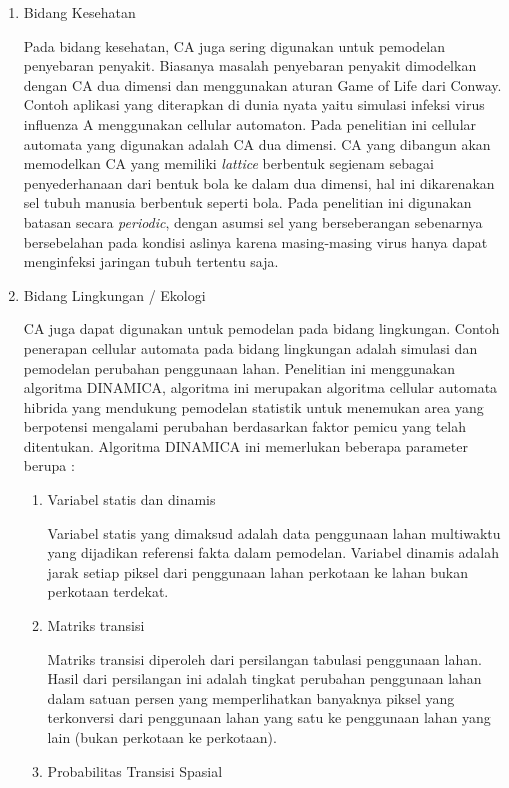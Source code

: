 \begin{enumerate}
\begin{enumerate}
\begin{enumerate}
\begin{enumerate}
			\end{enumerate}
			
			
			\item Bidang Kesehatan
			
			Pada bidang kesehatan, CA juga sering digunakan untuk pemodelan penyebaran penyakit. Biasanya masalah penyebaran penyakit dimodelkan dengan CA dua dimensi dan menggunakan aturan Game of Life dari Conway. Contoh aplikasi yang diterapkan di dunia nyata yaitu simulasi infeksi virus influenza A menggunakan cellular automaton. Pada penelitian ini cellular automata yang digunakan adalah CA dua dimensi. CA yang dibangun akan memodelkan CA yang memiliki \textit{lattice} berbentuk segienam sebagai penyederhanaan dari bentuk bola ke dalam dua dimensi, hal ini dikarenakan sel tubuh manusia berbentuk seperti bola. Pada penelitian ini digunakan batasan secara \textit{periodic}, dengan asumsi sel yang berseberangan sebenarnya bersebelahan pada kondisi aslinya karena masing-masing virus hanya dapat menginfeksi jaringan tubuh tertentu saja. \cite{referensiCA1}
			
			\item Bidang Lingkungan / Ekologi
			
			CA juga dapat digunakan untuk pemodelan pada bidang lingkungan. Contoh penerapan cellular automata pada bidang lingkungan adalah simulasi dan pemodelan perubahan penggunaan lahan. Penelitian ini menggunakan algoritma DINAMICA, algoritma ini merupakan algoritma cellular automata hibrida yang mendukung pemodelan statistik untuk menemukan area yang berpotensi mengalami perubahan berdasarkan faktor pemicu yang telah ditentukan. Algoritma DINAMICA ini memerlukan beberapa parameter berupa :
			\begin{enumerate}
				\item Variabel statis dan dinamis
				
				Variabel statis yang dimaksud adalah data penggunaan lahan multiwaktu yang dijadikan referensi fakta dalam pemodelan. Variabel dinamis adalah jarak setiap piksel dari penggunaan lahan perkotaan ke lahan bukan perkotaan terdekat.
				\item Matriks transisi
				
				Matriks transisi diperoleh dari persilangan tabulasi penggunaan lahan. Hasil dari persilangan ini adalah tingkat perubahan penggunaan lahan dalam satuan persen yang memperlihatkan banyaknya piksel yang terkonversi dari penggunaan lahan yang satu ke penggunaan lahan yang lain (bukan perkotaan ke perkotaan).
				\item Probabilitas Transisi Spasial
				

\end{enumerate}
\end{enumerate}
\end{enumerate}
\end{enumerate}
